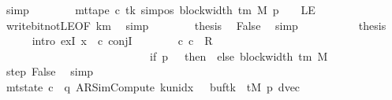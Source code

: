 \begin{isabellebody}
\ simp\isanewline
\ \ \ \ \ \ \isamarkupfalse%
\ {\isachardoublequoteopen}mt{\isacharunderscore}{\kern0pt}tape\ c{\isacharprime}{\kern0pt}\ tk\ {\isacharparenleft}{\kern0pt}sim{\isacharunderscore}{\kern0pt}pos\ {\isacharparenleft}{\kern0pt}block{\isacharunderscore}{\kern0pt}width\ {\isacharparenleft}{\kern0pt}{\isasymGamma}{\isacharunderscore}{\kern0pt}tm\ M{\isacharparenright}{\kern0pt}{\isacharparenright}{\kern0pt}\ p\ {\isacharminus}{\kern0pt}\ {}{\isacharparenright}{\kern0pt}\ {\isasymnoteq}\ LE{}{\isachardoublequoteclose}\isanewline
\ \ \ \ \ \ \ \ \isamarkupfalse%
\ write{\isacharunderscore}{\kern0pt}bit{\isacharunderscore}{\kern0pt}not{\isacharunderscore}{\kern0pt}LE{}{\isacharbrackleft}{\kern0pt}OF\ km{}{\isacharbrackright}{\kern0pt}\ \isamarkupfalse%
\ simp\isanewline
\ \ \ \ \ \ \isamarkupfalse%
\ {\isacharquery}{\kern0pt}thesis\ \isamarkupfalse%
\ False\ \isamarkupfalse%
\ simp\isanewline
\ \ \ \ \isamarkupfalse%
\isanewline
\ \ \ \ \isamarkupfalse%
\ {\isacharquery}{\kern0pt}thesis\isanewline
\ \ \ \ \isamarkupfalse%
\ {\isacharparenleft}{\kern0pt}intro\ exI{\isacharbrackleft}{\kern0pt}\ x\ {\isacharequal}{\kern0pt}\ c{\isacharprime}{\kern0pt}{\isacharprime}{\kern0pt}{\isacharbrackright}{\kern0pt}\ conjI{\isacharparenright}{\kern0pt}\isanewline
\ \ \ \ \ \ \isamarkupfalse%
\ {\isachardoublequoteopen}{\isacharparenleft}{\kern0pt}c{\isacharprime}{\kern0pt}{\isacharcomma}{\kern0pt}\ c{\isacharprime}{\kern0pt}{\isacharprime}{\kern0pt}{\isacharparenright}{\kern0pt}\ {\isasymin}\ R{\isacharprime}{\kern0pt}\isanewline
\ \ \ \ \ \ \ \ \ \ \ \ \ \ \ \ \ \ \ \ \ \ \ \ \ \ {\isacharcircum}{\kern0pt}{\isacharcircum}{\kern0pt}\ {\isacharparenleft}{\kern0pt}if\ p\ {\isacharequal}{\kern0pt}\ {}\ then\ {}\ else\ block{\isacharunderscore}{\kern0pt}width\ {\isacharparenleft}{\kern0pt}{\isasymGamma}{\isacharunderscore}{\kern0pt}tm\ M{\isacharparenright}{\kern0pt}\ {\isacharplus}{\kern0pt}\ {}{\isacharparenright}{\kern0pt}{\isachardoublequoteclose}\isanewline
\ \ \ \ \ \ \ \ \isamarkupfalse%
\ step\ False\ \isamarkupfalse%
\ simp\isanewline
\ \ \ \ \ \ \isamarkupfalse%
\ {\isachardoublequoteopen}mt{\isacharunderscore}{\kern0pt}state\ c{\isacharprime}{\kern0pt}{\isacharprime}{\kern0pt}\ {\isacharequal}{\kern0pt}\ {\isacharparenleft}{\kern0pt}q{\isacharcomma}{\kern0pt}\ AR{\isacharunderscore}{\kern0pt}SimCompute{\isacharcomma}{\kern0pt}\ k{\isacharunderscore}{\kern0pt}unidx\ {}{\isacharcomma}{\kern0pt}\ {}{\isacharcomma}{\kern0pt}\ buf{\isacharparenleft}{\kern0pt}tk\ {\isacharcolon}{\kern0pt}{\isacharequal}{\kern0pt}\ tM\ p{\isacharparenright}{\kern0pt}{\isacharcomma}{\kern0pt}\ dvec{\isacharcomma}{\kern0pt}\isanewline

\end{isabellebody}
